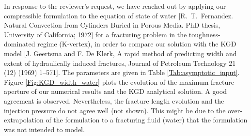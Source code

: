 \documentclass{elsarticle}
\begin{document}


In response to the reviewer's request, we have reached out by applying our compressible formulation to the equation of state of water [R.~T.~Fernandez. Natural Convection from Cylinders Buried in Porous Media. PhD thesis, University of California; 1972] for a fracturing problem in the toughness-dominated regime (K-vertex), in order to compare our solution with the KGD model [J. Geertsma and F. De Klerk, A rapid method of predicting width and extent of hydraulically induced fractures, Journal of Petroleum Technology 21 (12) (1969) 1–571].
The parameters are given in Table \ref{Tab:asymptotic_input}.
Figure \ref{Fig:KGD_width_water} plots the evolution of the maximum fracture aperture of our numerical results and the KGD analytical solution. A good agreement is observed.
Nevertheless, the fracture length evolution and the injection pressure do not agree well (not shown). This might be due to the over-extrapolation of the formulation to a fracturing fluid (water) that the formulation was not intended to model.
\end{document}
